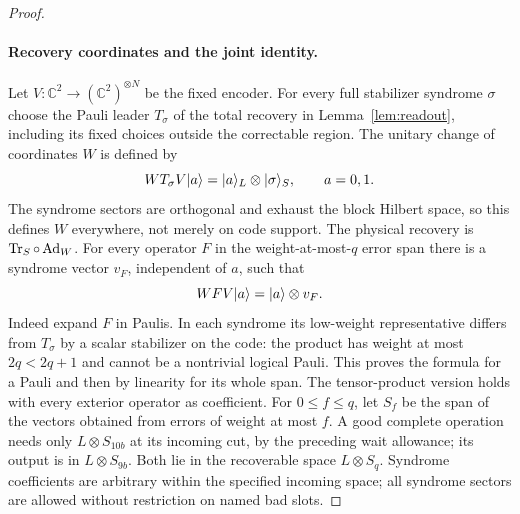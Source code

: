 \begin{proof}
\paragraph{Recovery coordinates and the joint identity.}
Let $V:\mathbb C^2\to(\mathbb C^2)^{\otimes N}$ be the fixed encoder. For every full stabilizer syndrome $\sigma$ choose the Pauli leader $T_\sigma$ of the total recovery in Lemma~\ref{lem:readout}, including its fixed choices outside the correctable region. The unitary change of coordinates $W$ is defined by
\[
 W T_\sigma V\lvert a\rangle=\lvert a\rangle_L\otimes\lvert \sigma\rangle_S,
 \qquad a=0,1.
\]
The syndrome sectors are orthogonal and exhaust the block Hilbert space, so this defines $W$ everywhere, not merely on code support. The physical recovery is $\operatorname{Tr}_S\circ\operatorname{Ad}_W$. For every operator $F$ in the weight-at-most-$q$ error span there is a syndrome vector $v_F$, independent of $a$, such that
\begin{equation}\label{eq:recoverycoordinates}
 WF V\lvert a\rangle=\lvert a\rangle\otimes v_F .
\end{equation}
Indeed expand $F$ in Paulis. In each syndrome its low-weight representative differs from $T_\sigma$ by a scalar stabilizer on the code: the product has weight at most $2q<2q+1$ and cannot be a nontrivial logical Pauli. This proves the formula for a Pauli and then by linearity for its whole span. The tensor-product version holds with every exterior operator as coefficient. For $0\le f\le q$, let $S_f$ be the span of the vectors obtained from errors of weight at most $f$. A good complete operation needs only $L\otimes S_{10b}$ at its incoming cut, by the preceding wait allowance; its output is in $L\otimes S_{9b}$. Both lie in the recoverable space $L\otimes S_q$. Syndrome coefficients are arbitrary within the specified incoming space; all syndrome sectors are allowed without restriction on named bad slots.


\end{proof}
